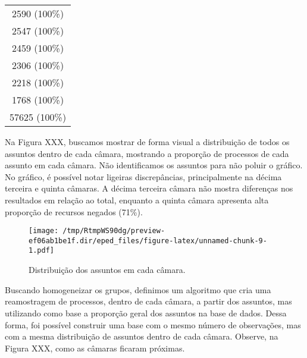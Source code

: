 \documentclass[10pt,]{article}
\begin{document}
\begin{longtable}[c]{@{}c@{}}
\begin{minipage}[t]{0.16\columnwidth}\centering\strut
2590 (100\%)
\strut\end{minipage}\tabularnewline
\begin{minipage}[t]{0.16\columnwidth}\centering\strut
2547 (100\%)
\strut\end{minipage}\tabularnewline
\begin{minipage}[t]{0.16\columnwidth}\centering\strut
2459 (100\%)
\strut\end{minipage}\tabularnewline
\begin{minipage}[t]{0.16\columnwidth}\centering\strut
2306 (100\%)
\strut\end{minipage}\tabularnewline
\begin{minipage}[t]{0.16\columnwidth}\centering\strut
2218 (100\%)
\strut\end{minipage}\tabularnewline
\begin{minipage}[t]{0.16\columnwidth}\centering\strut
1768 (100\%)
\strut\end{minipage}\tabularnewline
\begin{minipage}[t]{0.16\columnwidth}\centering\strut
57625 (100\%)
\strut\end{minipage}\tabularnewline
\bottomrule
\end{longtable}

Na Figura XXX, buscamos mostrar de forma visual a distribuição de todos
os assuntos dentro de cada câmara, mostrando a proporção de processos de
cada assunto em cada câmara. Não identificamos os assuntos para não
poluir o gráfico. No gráfico, é possível notar ligeiras discrepâncias,
principalmente na décima terceira e quinta câmaras. A décima terceira
câmara não mostra diferenças nos resultados em relação ao total,
enquanto a quinta câmara apresenta alta proporção de recursos negados
(71\%).

\begin{figure}[htbp]
\centering
\texttt{[image: /tmp/RtmpWS90dg/preview-ef06ab1be1f.dir/eped\_files/figure-latex/unnamed-chunk-9-1.pdf]}
\caption{Distribuição dos assuntos em cada câmara.}
\end{figure}

Buscando homogeneizar os grupos, definimos um algoritmo que cria uma
reamostragem de processos, dentro de cada câmara, a partir dos assuntos,
mas utilizando como base a proporção geral dos assuntos na base de
dados. Dessa forma, foi possível construir uma base com o mesmo número
de observações, mas com a mesma distribuição de assuntos dentro de cada
câmara. Observe, na Figura XXX, como as câmaras ficaram próximas.
\end{document}
